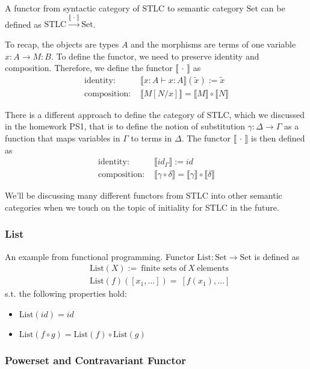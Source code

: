 \documentclass[12pt]{article}
\theoremstyle{plain}
\theoremstyle{definition}
\theoremstyle{remark}
\newcommand{\sem}[1]{\llbracket#1\rrbracket}
\newcommand{\Set}{\mathrm{Set}}
\begin{document}
A functor from syntactic category of STLC to semantic category $\Set$ can be defined as $\mathrm{STLC} \overset{\sem{\,\cdot\,}}{\longrightarrow} \Set$.

To recap, the objects are types $A$ and the morphisms are terms of one variable $x : A \to M : B$. To define the functor, we need to preserve identity and composition. Therefore, we define the functor $\sem{\,\cdot\,}$ as
\begin{align*}
  \text{identity: }& \sem{x : A \vdash x : A}(\tilde{x}) := \tilde{x} \\
  \text{composition: }& \sem{M[N/x]} = \sem{M} \circ \sem{N}
\end{align*}

There is a different approach to define the category of STLC, which we discussed in the homework PS1, that is to define the notion of substitution $\gamma : \Delta \to \Gamma$ as a function that maps variables in $\Gamma$ to terms in $\Delta$. The functor $\sem{\,\cdot\,}$ is then defined as
\begin{align*}
  \text{identity: }& \sem{id_{\Gamma}} := id \\
  \text{composition: }& \sem{\gamma \circ \delta} = \sem{\gamma} \circ \sem{\delta}
\end{align*}

We'll be discussing many different functors from STLC into other semantic categories when we touch on the topic of initiality for STLC in the future.

\subsubsection*{List}

An example from functional programming. Functor $\mathrm{List} : \Set \to \Set$ is defined as
\begin{align*}
  &\mathrm{List}(X) :=~\text{finite sets of}~X~\text{elements} \\
  &\mathrm{List}(f)([x_1, \dots]) =~[f(x_1), \dots]
\end{align*}
s.t. the following properties hold:
\begin{itemize}
  \item $\mathrm{List}(id) = id$
  \item $\mathrm{List}(f \circ g) = \mathrm{List}(f) \circ \mathrm{List}(g)$
\end{itemize}


\subsubsection*{Powerset and Contravariant Functor}
\end{document}
